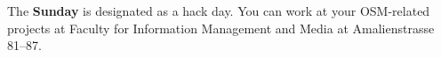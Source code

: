 
\noindent
The \textbf{Sunday} is designated as a hack day. You can work at your OSM-related projects at Faculty for Information Management and Media at Amalienstrasse 81--87.
